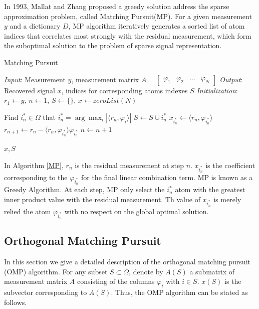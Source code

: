 \documentclass{ucsdreport}
\begin{document}
In 1993, Mallat and Zhang \cite{mallat1993matching} proposed a greedy solution address the sparse approximation problem, called Matching Pursuit(MP). For a given measurement $y$ and a dictionary $D$, MP algorithm iteratively generates a sorted list of atom indices that correlates most strongly with the residual measurement, which form the suboptimal solution to the problem of sparse signal representation.
\begin{algorithm}
\caption{Matching Pursuit}\label{MP}

\BState \emph{Input}: Measurement $y$, measurement matrix $A=\begin{bmatrix}\varphi_1&\varphi_2&\dots&\varphi_N\end{bmatrix}$
\BState \emph{Output}: Recovered signal $x$, indices for corresponding atoms indexes $S$
\BState \emph{Initialization}: $r_1\gets y$, $n\gets 1$, $S \gets \{\}$, $x \gets zeroList(N)$

\begin{algorithmic}[1]
    \State Find $i^*_n \in \Omega$ that $i^*_n=\arg\max_i |\langle r_n,\varphi_i \rangle| $
    \State $S \gets S \cup i^*_n$
    \State $x_{i^*_n} \gets \langle r_n,\varphi_{i^*_n} \rangle$
    \State $r_{n+1} \gets r_{n} - \langle r_n,\varphi_{i^*_n} \rangle\varphi_{i^*_n}$
    \State $n \gets n+1$
    
    \State \Return $x,S$
\end{algorithmic}
\end{algorithm}
\newline
In Algorithm \ref{MP}, $r_n$ is the residual measurement at step $n$. $x_{i^*_n}$ is the coefficient corresponding to the $\varphi_{i^*_n}$ for the final linear combination term. MP is known as a Greedy Algorithm. At each step, MP only select the $i^*_n$ atom with the greatest inner product value with the residual measurement. Th value of $x_{i^*_n}$ is merely relied the atom $\varphi_{i^*_n}$ with no respect on the global optimal solution.

\subsection{Orthogonal Matching Pursuit}
In this section we give a detailed description of the orthogonal matching pursuit (OMP) algorithm. For
any subset $S \subset \Omega$, denote by $A(S)$ a submatrix of measurement matrix $A$
consisting of the columns $\varphi_i$ with $i\in S$. $x(S)$ is the subvector corresponding to $A(S)$. Thus, the OMP algorithm can be stated as follows.
\end{document}
